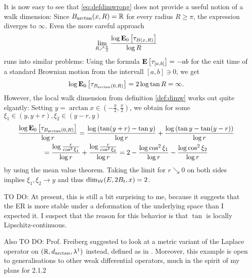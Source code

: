 It is now easy to see that \eqref{eq:defdimwrong} does not provide a useful notion of a walk dimension: Since $B_{\arctan}(x,R)=\IR$ for every radius $R\geq\pi$, the expression diverges to $\infty$. Even the more careful approach 
\[
  \lim_{R\nearrow\frac{\pi}{2}}\frac{\log \PTEp{\tau_{B(x,R)}}{0}}{\log R}
\]
runs into similar problems: Using the formula $\PTE{\tau_{[a,b]}}=-ab$ for the exit time of a standard Brownian motion from the intervall $[a,b]\ni 0$, we get
\[
  \log \PTEp{\tau_{B_{\arctan}(0,R)}}{0}=2\log \tan R =\infty.
\]
However, the local walk dimension from definition \ref{def:dimw} works out quite elgantly: Setting $y=\arctan x\in\left(-\frac{\pi}{2},\frac{\pi}{2}\right)$, we obtain for some $\xi_1\in (y,y+r),\xi_2\in(y-r,y)$
\begin{multline*}
  \frac{\log \PTEp{\tau_{B_{\arctan}(0,R)}}{0}}{\log r}
  =\frac{\log\left(\tan(y+r)-\tan y\right)}{\log r}+\frac{\log\left(\tan y-\tan (y-r)\right)}{\log r}\\
  =\frac{\log\frac{r}{\cos^2 \xi_1}}{\log r}+\frac{\log\frac{r}{\cos^2 \xi_2}}{\log r}
  =2-\frac{\log \cos^2 \xi_1}{\log r}-\frac{\log\cos^2 \xi_2}{\log r}
\end{multline*}
by using the mean value theorem. Taking the limit for $r\searrow0$ on both sides implies $\xi_1,\xi_2\to y$ and thus $\dimw(E,2B_t,x)=2$. 

TO DO: At present, this is still a bit surprising to me, because it suggests that the ER is more stable under a deformation of the underlying space than I expected it. I suspect that the reason for this behavior is that $\tan$ is locally Lipschitz-continuous. 

Also TO DO: Prof. Freiberg suggested to look at a metric variant of the Laplace operator on $(\IR,d_{\arctan},\gl^1)$ instead, defined as in \cite[def. 7.43]{shioya2016metric}.
Moreover, this example is open to generalisations to other weak differential operators, much in the spirit of my plans for 2.1.2






